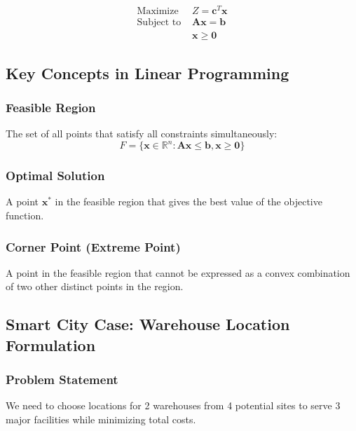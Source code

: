 \documentclass[
  letterpaper,
  DIV=11,
  numbers=noendperiod]{scrreprt}
\begin{document}
\[
\begin{aligned}
\text{Maximize } & Z = \mathbf{c}^T\mathbf{x} \\
\text{Subject to } & \mathbf{A}\mathbf{x} = \mathbf{b} \\
& \mathbf{x} \geq \mathbf{0}
\end{aligned}
\]

\subsection{Key Concepts in Linear
Programming}\label{key-concepts-in-linear-programming}

\subsubsection{Feasible Region}\label{feasible-region}

The set of all points that satisfy all constraints simultaneously: \[
F = \{\mathbf{x} \in \mathbb{R}^n : \mathbf{A}\mathbf{x} \leq \mathbf{b}, \mathbf{x} \geq \mathbf{0}\}
\]

\subsubsection{Optimal Solution}\label{optimal-solution}

A point \(\mathbf{x}^*\) in the feasible region that gives the best
value of the objective function.

\subsubsection{Corner Point (Extreme
Point)}\label{corner-point-extreme-point}

A point in the feasible region that cannot be expressed as a convex
combination of two other distinct points in the region.

\subsection{Smart City Case: Warehouse Location
Formulation}\label{smart-city-case-warehouse-location-formulation}

\subsubsection{Problem Statement}\label{problem-statement}

We need to choose locations for 2 warehouses from 4 potential sites to
serve 3 major facilities while minimizing total costs.
\end{document}

